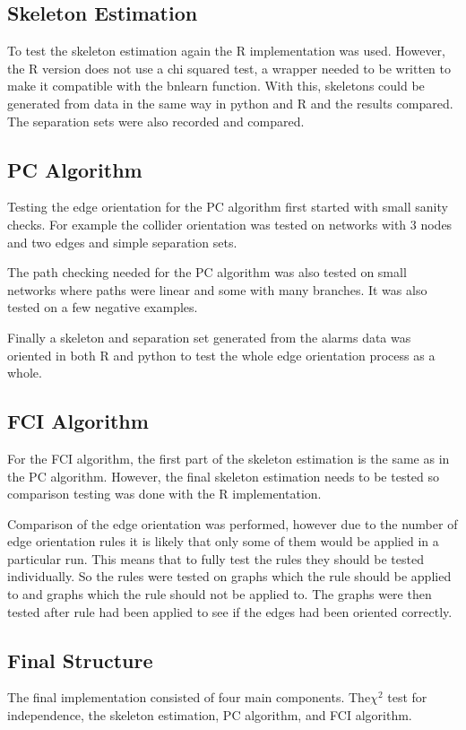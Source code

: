 \documentclass{UoYCSproject}
\begin{document}
\subsection{Skeleton Estimation}
To test the skeleton estimation again the R implementation was used. However, the R version does not use a chi squared test, a wrapper needed to be written to make it compatible with the bnlearn function. With this, skeletons could be generated from data in the same way in python and R and the results compared. The separation sets were also recorded and compared.

\subsection{PC Algorithm}
Testing the edge orientation for the PC algorithm first started with small sanity checks. For example the collider orientation was tested on networks with 3 nodes and two edges and simple separation sets.

The path checking needed for the PC algorithm was also  tested on small networks where paths were linear and some with many branches. It was also tested on a few negative examples.

Finally a skeleton and separation set generated from the alarms data was oriented in both R and python to test the whole edge orientation process as a whole.

\subsection{FCI Algorithm}
For the FCI algorithm, the first part of the skeleton estimation is the same as in the PC algorithm. However, the final skeleton estimation needs to be tested so comparison testing was done with the R implementation.

Comparison of the edge orientation was performed, however due to the number of edge orientation rules it is likely that only some of them would be applied in a particular run. This means that to fully test the rules they should be tested individually. So the rules were tested on graphs which the rule should be applied to and graphs which the rule should not be applied to. The graphs were then tested after rule had been applied to see if the edges had been oriented correctly.

\subsection{Final Structure}
The final implementation consisted of four main components. The$\chi^2$ test for independence, the skeleton estimation, PC algorithm, and FCI algorithm.
\end{document}
